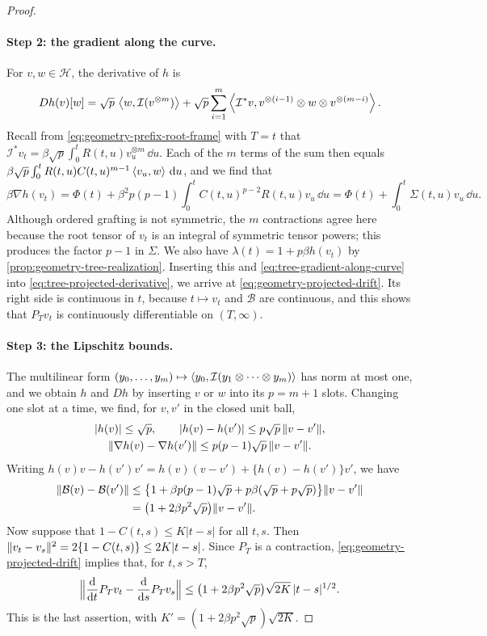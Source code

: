 \begin{proof}
\paragraph{Step 2: the gradient along the curve.}
For $v,w\in\mathcal H$, the derivative of $h$ is
\[
 Dh(v)[w]=\sqrt p\,\left\langle w,\mathcal I(v^{\otimes m})\right\rangle
 +\sqrt p\sum_{i=1}^m\left\langle\mathcal I^*v,v^{\otimes(i-1)}\otimes w\otimes v^{\otimes(m-i)}\right\rangle.
\]
Recall from \eqref{eq:geometry-prefix-root-frame} with $T=t$ that $\mathcal I^*v_t=\beta\sqrt p\int_0^tR(t,u)v_u^{\otimes m}\,\dd u$. Each of the $m$ terms of the sum then equals $\beta\sqrt p\int_0^tR(t,u)C(t,u)^{m-1}\left\langle v_u,w\right\rangle\,\mathop{}\!\mathrm d u$, and we find that
\begin{equation}\label{eq:tree-gradient-along-curve}
 \beta\nabla h(v_t)=\Phi(t)+\beta^2p(p-1)\int_0^tC(t,u)^{p-2}R(t,u)v_u\,\dd u
 =\Phi(t)+\int_0^t\Sigma(t,u)v_u\,\dd u.
\end{equation}
Although ordered grafting is not symmetric, the $m$ contractions agree here because the root tensor of $v_t$ is an integral of symmetric tensor powers; this produces the factor $p-1$ in $\Sigma$. We also have $\lambda(t)=1+p\beta h(v_t)$ by \cref{prop:geometry-tree-realization}. Inserting this and \eqref{eq:tree-gradient-along-curve} into \eqref{eq:tree-projected-derivative}, we arrive at \eqref{eq:geometry-projected-drift}. Its right side is continuous in $t$, because $t\mapsto v_t$ and $\mathcal B$ are continuous, and this shows that $P_Tv_t$ is continuously differentiable on $(T,\infty)$.

\paragraph{Step 3: the Lipschitz bounds.}
The multilinear form $(y_0,\dots,y_m)\mapsto\left\langle y_0,\mathcal I(y_1\otimes\dots\otimes y_m)\right\rangle$ has norm at most one, and we obtain $h$ and $Dh$ by inserting $v$ or $w$ into its $p=m+1$ slots. Changing one slot at a time, we find, for $v,v'$ in the closed unit ball,
\begin{gather*}
 |h(v)|\le\sqrt p,\qquad |h(v)-h(v')|\le p\sqrt p\,\lVert v-v'\rVert,\\
 \lVert\nabla h(v)-\nabla h(v')\rVert\le p(p-1)\sqrt p\,\lVert v-v'\rVert.
\end{gather*}
Writing $h(v)v-h(v')v'=h(v)(v-v')+\{h(v)-h(v')\}v'$, we have
\[
\begin{aligned}
 \lVert\mathcal B(v)-\mathcal B(v')\rVert
 &\le\bigl\{1+\beta p(p-1)\sqrt p+p\beta(\sqrt p+p\sqrt p)\bigr\}\lVert v-v'\rVert\\
 &=\bigl(1+2\beta p^2\sqrt p\bigr)\lVert v-v'\rVert.
\end{aligned}
\]
Now suppose that $1-C(t,s)\le K|t-s|$ for all $t,s$. Then $\lVert v_t-v_s\rVert^2=2\{1-C(t,s)\}\le2K|t-s|$. Since $P_T$ is a contraction, \eqref{eq:geometry-projected-drift} implies that, for $t,s>T$,
\[
 \Bigl\|\frac{\mathop{}\!\mathrm d}{\mathop{}\!\mathrm d t}P_Tv_t-\frac{\mathop{}\!\mathrm d}{\mathop{}\!\mathrm d s}P_Tv_s\Bigr\|
 \le\bigl(1+2\beta p^2\sqrt p\bigr)\sqrt{2K}\,|t-s|^{1/2}.
\]
This is the last assertion, with $K'=(1+2\beta p^2\sqrt p)\sqrt{2K}$.
\end{proof}

